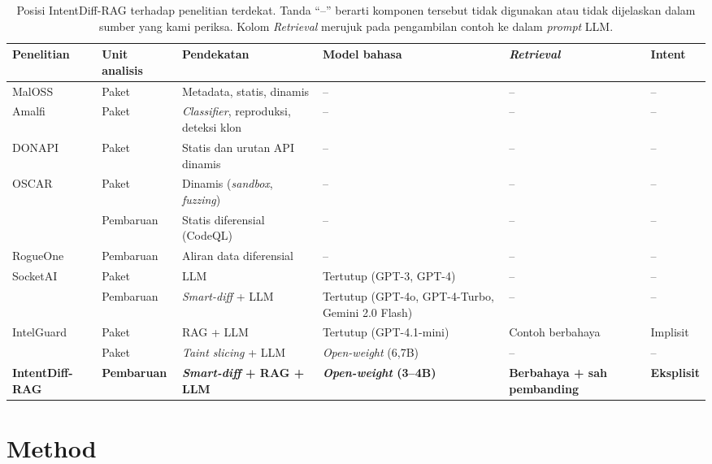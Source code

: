 \documentclass[a4paper,fleqn]{cas-dc}
\begin{document}
\begin{table}[t]
\caption{Posisi IntentDiff-RAG terhadap penelitian terdekat. Tanda ``--''
berarti komponen tersebut tidak digunakan atau tidak dijelaskan dalam sumber
yang kami periksa. Kolom \emph{Retrieval} merujuk pada pengambilan contoh ke
dalam \emph{prompt} LLM.}
\label{tab:positioning}
\small
\begin{tabular}{p{3.2cm} p{1.6cm} p{3.9cm} p{3.2cm} p{2.4cm} p{1.8cm}}
\hline
Penelitian & Unit analisis & Pendekatan & Model bahasa & \emph{Retrieval} & Intent \\
\hline
MalOSS \citep{duan2021towards} & Paket & Metadata, statis, dinamis & -- & -- & -- \\
Amalfi \citep{sejfia2022practical} & Paket & \emph{Classifier}, reproduksi, deteksi klon & -- & -- & -- \\
DONAPI \citep{huang2024donapi} & Paket & Statis dan urutan API dinamis & -- & -- & -- \\
OSCAR \citep{zheng2024towards} & Paket & Dinamis (\emph{sandbox}, \emph{fuzzing}) & -- & -- & -- \\
\citet{froh2023differential} & Pembaruan & Statis diferensial (CodeQL) & -- & -- & -- \\
RogueOne \citep{sofaer2024rogueone} & Pembaruan & Aliran data diferensial & -- & -- & -- \\
SocketAI \citep{zahan2025leveraging} & Paket & LLM & Tertutup (GPT-3, GPT-4) & -- & -- \\
\citet{wyss2025evaluating} & Pembaruan & \emph{Smart-diff} + LLM & Tertutup (GPT-4o, GPT-4-Turbo, Gemini 2.0 Flash) & -- & -- \\
IntelGuard \citep{guo2026bridging} & Paket & RAG + LLM & Tertutup (GPT-4.1-mini) & Contoh berbahaya & Implisit \\
\citet{nguyen2025taint} & Paket & \emph{Taint slicing} + LLM & \emph{Open-weight} (6,7B) & -- & -- \\
\textbf{IntentDiff-RAG} & \textbf{Pembaruan} & \textbf{\emph{Smart-diff} + RAG + LLM} & \textbf{\emph{Open-weight} (3--4B)} & \textbf{Berbahaya + sah pembanding} & \textbf{Eksplisit} \\
\hline
\end{tabular}
\end{table}

\section{Method}\label{sec:method}
\end{document}
